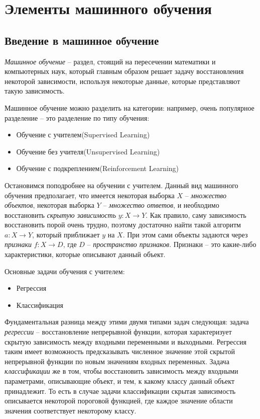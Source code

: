 \section{Элементы машинного обучения} %

\subsection{Введение в машинное обучение}
{\it Машинное обучение} -- раздел, стоящий на пересечении математики и компьютерных наук, который главным образом решает задачу восстановления некоторой зависимости, используя некоторые данные, которые представляют такую зависимость. 

Машинное обучение можно разделить на категории: например, очень популярное разделение -- это разделение по типу обучения:
\begin{itemize}
	\item Обучение с учителем(Supervised Learning)
	\item Обучение без учителя(Unsupervised Learning)
	\item Обучение с подкреплением(Reinforcement Learning)
\end{itemize}

Остановимся поподробнее на обучении с учителем. Данный вид машинного обучения предполагает, что имеется некоторая выборка $X$ -- {\it множество объектов}, некоторая выборка $Y$ -- {\it множество ответов}, и необходимо восстановить {\it скрытую зависимость} $y: X \to Y$. Как правило, саму зависимость восстановить порой очень трудно, поэтому достаточно найти такой алгоритм $a: X \to Y$, который приближает $y$ на $X$. При этом сами объекты задаются через {\it признаки} $f: X \to D$, где $D$ -- {\it пространство признаков}. Признаки -- это какие-либо характеристики, которые описывают данный объект. 

Основные задачи обучения с учителем:
\begin{itemize}
	\item Регрессия
	\item Классификация
\end{itemize}

Фундаментальная разница между этими двумя типами задач следующая: задача {\it регрессии} -- восстановление непрерывной функции, которая характеризует скрытую зависимость между входными переменными и выходными. Регрессия таким имеет возможность предсказывать численное значение этой скрытой непрерывной функции по новым значениям входных переменных. Задача {\it классификации} же в том, чтобы восстановить зависимость между входными параметрами, описывающие объект, и тем, к какому классу данный объект принадлежит. То есть в случае задачи классификации скрытая зависимость описывается некоторой пороговой функцией, где каждое значение области значения соответствует некоторому классу.

